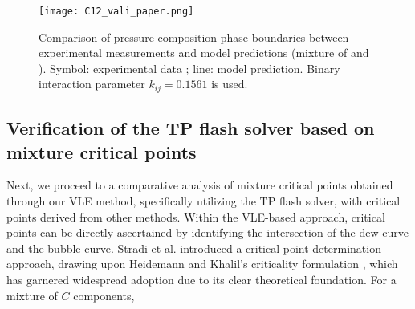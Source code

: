     \begin{figure}[htbp]
        \centering
        \texttt{[image: C12\_vali\_paper.png]}
        \centering
        \caption{Comparison of pressure-composition phase boundaries between experimental measurements and model predictions (mixture of  and ). Symbol: experimental data \cite{garcia2011vapor}; line: model prediction. Binary interaction parameter $k_{ij}=0.1561$ is used.}
        \label{C12_vali}
    \end{figure}

    
    \subsection{Verification of the TP flash solver based on mixture critical points}

    Next, we proceed to a comparative analysis of mixture critical points obtained through our VLE method, specifically utilizing the TP flash solver, with critical points derived from other methods. Within the VLE-based approach, critical points can be directly ascertained by identifying the intersection of the dew curve and the bubble curve.
    Stradi et al. \cite{stradi2001reliable} introduced a critical point determination approach, drawing upon Heidemann and Khalil's criticality formulation \cite{heidemann1980calculation}, which has garnered widespread adoption due to its clear theoretical foundation. For a mixture of $C$ components,

